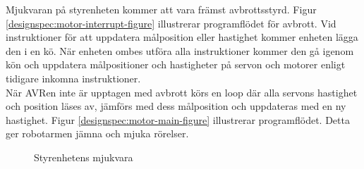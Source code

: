 Mjukvaran på styrenheten kommer att vara främst avbrottsstyrd. Figur \ref{designspec:motor-interrupt-figure} illustrerar programflödet för avbrott. Vid instruktioner för att uppdatera målposition eller hastighet kommer enheten lägga den i en kö. När enheten ombes utföra alla instruktioner kommer den gå igenom kön och uppdatera målpositioner och hastigheter på servon och motorer enligt tidigare inkomna instruktioner. \\
När AVRen inte är upptagen med avbrott körs en loop där alla servons hastighet och position läses av, jämförs med dess målposition och uppdateras med en ny hastighet. Figur \ref{designspec:motor-main-figure} illustrerar programflödet. Detta ger robotarmen jämna och mjuka rörelser. \\

\begin{figure}
\centering
\begin{minipage}[b]{.5\linewidth}
\centering
\scalebox{0.7}{}
\label{designspec:motor-interrupt-figure}
\end{minipage}%
\begin{minipage}[b]{.5\linewidth}
\centering
\scalebox{0.7}{}
\label{designspec:motor-main-figure}
\end{minipage}
\caption{Styrenhetens mjukvara}\label{fig:1}
\end{figure}
